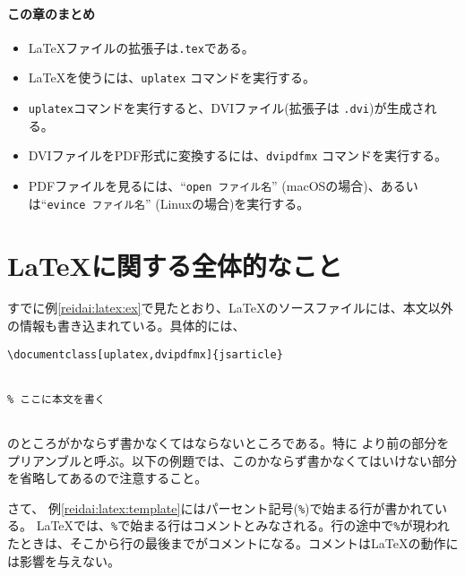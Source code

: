\paragraph{この章のまとめ}

\begin{itemize}
    \item \LaTeX ファイルの拡張子は\texttt{.tex}である。
    \item \LaTeX を使うには、\texttt{uplatex} コマンドを実行する。
    \item \texttt{uplatex}コマンドを実行すると、DVIファイル(拡張子は \texttt{.dvi})が生成される。
    \item DVIファイルをPDF形式に変換するには、\texttt{dvipdfmx} コマンドを実行する。
    \item PDFファイルを見るには、``\texttt{open ファイル名}'' (macOSの場合)、あるいは``\texttt{evince ファイル名}'' (Linuxの場合)を実行する。
\end{itemize}

\section{\LaTeX に関する全体的なこと}
\label{sec:latex:global}

すでに例\ref{reidai:latex:ex}で見たとおり、\LaTeX のソースファイルには、本文以外の情報も書き込まれている。具体的には、
\begin{reidai}
    \label{reidai:latex:template}
    \begin{verbatim}
\documentclass[uplatex,dvipdfmx]{jsarticle}


% ここに本文を書く


\end{verbatim}
\end{reidai} \noindent
のところがかならず書かなくてはならないところである。特に \verb||より前の部分をプリアンブルと呼ぶ。以下の例題では、このかならず書かなくてはいけない部分を省略してあるので注意すること。

さて、 例\ref{reidai:latex:template}にはパーセント記号(\texttt{\%})で始まる行が書かれている。 \LaTeX では、\texttt{\%}で始まる行はコメントとみなされる。行の途中で\texttt{\%}が現われたときは、そこから行の最後までがコメントになる。コメントは\LaTeX の動作には影響を与えない。

